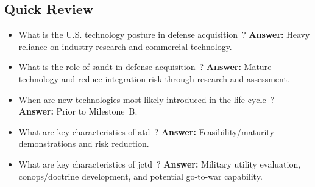 \documentclass[../main.tex]{subfiles}
\begin{document}
\subsection{Quick Review}
\begin{itemize}
  \item What is the U.S. technology posture in defense acquisition~\autocite{edo-3-3-4-research-development-2025}? \textbf{Answer:} Heavy reliance on industry research and commercial technology.
  \item What is the role of \ac{sandt} in defense acquisition~\autocite{edo-3-3-4-research-development-2025,USDRE-TRA-2025}? \textbf{Answer:} Mature technology and reduce integration risk through research and assessment.
  \item When are new technologies most likely introduced in the life cycle~\autocite{edo-3-3-4-research-development-2025,DoDFMR-Vol2B-Ch5,USDRE-TRA-2025}? \textbf{Answer:} Prior to Milestone~B.
  \item What are key characteristics of \ac{atd}~\autocite{edo-3-3-4-research-development-2025}? \textbf{Answer:} Feasibility/maturity demonstrations and risk reduction.
  \item What are key characteristics of \ac{jctd}~\autocite{edo-3-3-4-research-development-2025}? \textbf{Answer:} Military utility evaluation, \ac{conops}/doctrine development, and potential go-to-war capability.
\end{itemize}

\end{document}
